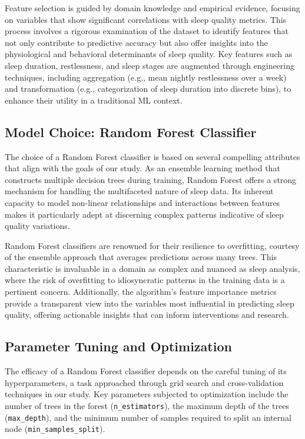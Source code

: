 \documentclass[10pt]{extarticle}
\begin{document}
Feature selection is guided by domain knowledge and empirical evidence, focusing on variables that show significant correlations with sleep quality metrics. This process involves a rigorous examination of the dataset to identify features that not only contribute to predictive accuracy but also offer insights into the physiological and behavioral determinants of sleep quality. Key features such as sleep duration, restlessness, and sleep stages are augmented through engineering techniques, including aggregation (e.g., mean nightly restlessness over a week) and transformation (e.g., categorization of sleep duration into discrete bins), to enhance their utility in a traditional ML context.

\subsection{Model Choice: Random Forest Classifier}

The choice of a Random Forest classifier is based on several compelling attributes that align with the goals of our study. As an ensemble learning method that constructs multiple decision trees during training, Random Forest offers a strong mechanism for handling the multifaceted nature of sleep data. Its inherent capacity to model non-linear relationships and interactions between features makes it particularly adept at discerning complex patterns indicative of sleep quality variations.

Random Forest classifiers are renowned for their resilience to overfitting, courtesy of the ensemble approach that averages predictions across many trees. This characteristic is invaluable in a domain as complex and nuanced as sleep analysis, where the risk of overfitting to idiosyncratic patterns in the training data is a pertinent concern. Additionally, the algorithm's feature importance metrics provide a transparent view into the variables most influential in predicting sleep quality, offering actionable insights that can inform interventions and research.

\subsection{Parameter Tuning and Optimization}

The efficacy of a Random Forest classifier depends on the careful tuning of its hyperparameters, a task approached through grid search and cross-validation techniques in our study. Key parameters subjected to optimization include the number of trees in the forest (\texttt{n\_estimators}), the maximum depth of the trees (\texttt{max\_depth}), and the minimum number of samples required to split an internal node (\texttt{min\_samples\_split}).
\end{document}
